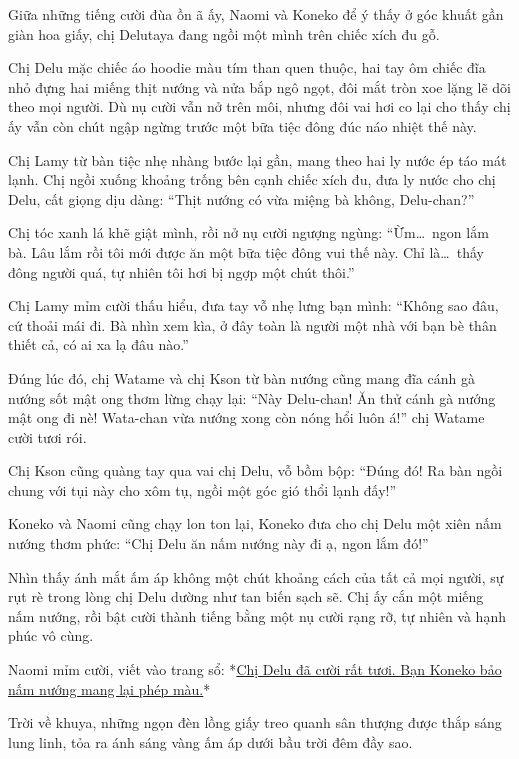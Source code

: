 \documentclass[../main.tex]{subfiles}
\begin{document}
\ct


Giữa những tiếng cười đùa ồn ã ấy, Naomi và Koneko để ý thấy ở góc khuất gần giàn hoa giấy, chị Delutaya đang ngồi một mình trên chiếc xích đu gỗ.

Chị Delu mặc chiếc áo hoodie màu tím than quen thuộc, hai tay ôm chiếc đĩa nhỏ đựng hai miếng thịt nướng và nửa bắp ngô ngọt, đôi mắt tròn xoe lặng lẽ dõi theo mọi người. Dù nụ cười vẫn nở trên môi, nhưng đôi vai hơi co lại cho thấy chị ấy vẫn còn chút ngập ngừng trước một bữa tiệc đông đúc náo nhiệt thế này.

Chị Lamy từ bàn tiệc nhẹ nhàng bước lại gần, mang theo hai ly nước ép táo mát lạnh. Chị ngồi xuống khoảng trống bên cạnh chiếc xích đu, đưa ly nước cho chị Delu, cất giọng dịu dàng: ``Thịt nướng có vừa miệng bà không, Delu-chan?''

Chị tóc xanh lá khẽ giật mình, rồi nở nụ cười ngượng ngùng: ``Ừm\dots\ ngon lắm bà. Lâu lắm rồi tôi mới được ăn một bữa tiệc đông vui thế này. Chỉ là\dots\ thấy đông người quá, tự nhiên tôi hơi bị ngợp một chút thôi.''

Chị Lamy mỉm cười thấu hiểu, đưa tay vỗ nhẹ lưng bạn mình: ``Không sao đâu, cứ thoải mái đi. Bà nhìn xem kìa, ở đây toàn là người một nhà với bạn bè thân thiết cả, có ai xa lạ đâu nào.''

Đúng lúc đó, chị Watame và chị Kson từ bàn nướng cũng mang đĩa cánh gà nướng sốt mật ong thơm lừng chạy lại: ``Này Delu-chan! Ăn thử cánh gà nướng mật ong đi nè! Wata-chan vừa nướng xong còn nóng hổi luôn á!'' chị Watame cười tươi rói.

Chị Kson cũng quàng tay qua vai chị Delu, vỗ bồm bộp: ``Đúng đó! Ra bàn ngồi chung với tụi này cho xôm tụ, ngồi một góc gió thổi lạnh đấy!''

Koneko và Naomi cũng chạy lon ton lại, Koneko đưa cho chị Delu một xiên nấm nướng thơm phức: ``Chị Delu ăn nấm nướng này đi ạ, ngon lắm đó!''

Nhìn thấy ánh mắt ấm áp không một chút khoảng cách của tất cả mọi người, sự rụt rè trong lòng chị Delu dường như tan biến sạch sẽ. Chị ấy cắn một miếng nấm nướng, rồi bật cười thành tiếng bằng một nụ cười rạng rỡ, tự nhiên và hạnh phúc vô cùng.

Naomi mỉm cười, viết vào trang sổ: *\uline{Chị Delu đã cười rất tươi. Bạn Koneko bảo nấm nướng mang lại phép màu.}*

\ct

Trời về khuya, những ngọn đèn lồng giấy treo quanh sân thượng được thắp sáng lung linh, tỏa ra ánh sáng vàng ấm áp dưới bầu trời đêm đầy sao.
\end{document}
